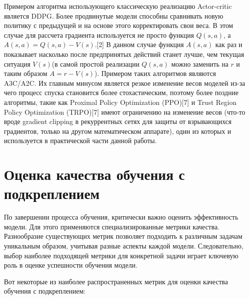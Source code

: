 \documentclass[bachelor, och, referat]{shiza}
\begin{document}
Примером алгоритма использующего классическую реализацию Actor-critic является DDPG. Более продвинутые модели способны сравнивать новую политику с предыдущей
и на основе этого корректировать свои веса. В этом случае для рассчета градиента используется не просто функция $Q(s,a)$, а $A(s,a) = Q(s,a) - V(s)$.[2] В данном случае
функция $A(s, a)$ как раз и показывает насколько после предпринятых действий станет лучше, чем текущая ситуация $V(s)$(в самой простой реализации $Q(s,a)$ можно
заменить на $r$ и таким образом $A = r - V(s)$). Примером таких алгоритмов являются A3C/A2C. Их главным минусом является резкое изменение весов моделей из-за чего
процесс спуска становится более стохастическим, поэтому более поздние алгоритмы, такие как Proximal Policy Optimization (PPO)[7] и Trust Region Policy Optimization (TRPO)[7]
имеют ограничению на изменение весов (что-то вроде gradient clipping в рекуррентных сетях для защиты от взрывающихся градиентов, только на другом математическом аппарате),
один из которых и используется в практической части данной работы.

\section{Оценка качества обучения с подкреплением}
По завершении процесса обучения, критически важно оценить эффективность модели. Для этого применяются специализированные метрики
качества. Разнообразие существующих метрик позволяет подходить к различным задачам уникальным образом, учитывая разные аспекты
каждой модели. Следовательно, выбор наиболее подходящей метрики для конкретной задачи играет ключевую роль в оценке успешности обучения
модели.

Вот некоторые из наиболее распространенных метрик для оценки качества обучения с подкреплением:
\end{document}
